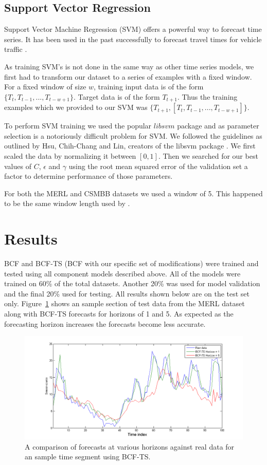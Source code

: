 \documentclass{acm_proc_article-sp}
\begin{document}
\subsection{Support Vector Regression}
Support Vector Machine Regression (SVM) offers a powerful way to forecast time series.  It has been used in the past successfully to forecast travel times for vehicle traffic \cite{Wu2004}.  

As training SVM's is not done in the same way as other time series models, we first had to transform our dataset to a series of examples with a fixed window.  For a fixed window of size $w$, training input data is of the form $\{T_{t}, T_{t - 1}, ..., T_{t - w + 1}\}$.  Target data is of the form $T_{t + 1}$.  Thus the training examples which we provided to our SVM was $\{T_{t + 1}, [T_{t}, T_{t - 1}, ..., T_{t - w + 1}]\}$.

To perform SVM training we used the popular $libsvm$ package and as parameter selection is a notoriously difficult problem for SVM.  We followed the guidelines as outlined by Hsu, Chih-Chang and Lin, creators of the libsvm package \cite{Hsu2003}.  We first scaled the data by normalizing it between $[0, 1]$.  Then we searched for our best values of $C$, $\epsilon$ and $\gamma$ using the root mean squared error of the validation set a factor to determine performance of those parameters. 

For both the MERL and CSMBB datasets we used a window of 5.  This happened to be the same window length used by \cite{Wu2004}.
\section{Results}

BCF and BCF-TS (BCF with our specific set of modifications) were trained and tested using all component models described above.  All of the models were trained on 60\% of the total datasets.  Another 20\% was used for model validation and the final 20\% used for testing.  All results shown below are on the test set only.  Figure~\ref{fig:realbcf} shows an sample section of test data from the MERL dataset along with BCF-TS forecasts for horizons of 1 and 5.   As expected as the forecasting horizon increases the forecasts become less accurate.

\begin{figure}[h]
\centering
\includegraphics[width = 1.0\linewidth]{real_forecasts_bcf.png}
\caption{A comparison of forecasts at various horizons against real data for an sample time segment using BCF-TS.}
\label{fig:realbcf}
\end{figure}
\end{document}
